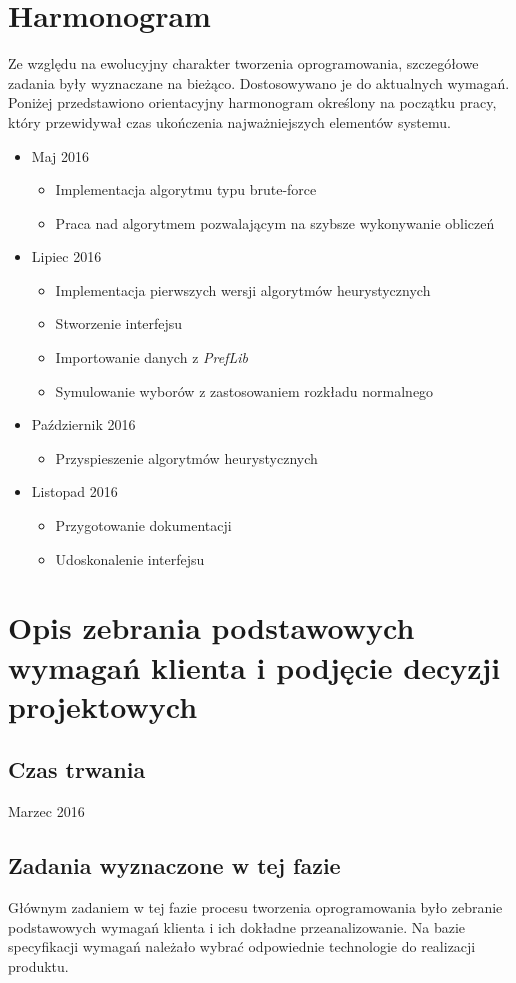 \documentclass[pdflatex,11pt]{../aghdoc_version2}
\begin{document}
\section{Harmonogram}
Ze względu na ewolucyjny charakter tworzenia oprogramowania, szczegółowe zadania były wyznaczane na bieżąco. Dostosowywano je do aktualnych wymagań. Poniżej przedstawiono orientacyjny harmonogram określony na początku pracy, który
przewidywał czas ukończenia najważniejszych elementów systemu.
\begin{itemize}
\item Maj 2016
	\begin{itemize}
	\item Implementacja algorytmu typu brute-force
	\item Praca nad algorytmem pozwalającym na szybsze wykonywanie obliczeń
	\end{itemize}
\item Lipiec 2016
	\begin{itemize}
	\item Implementacja pierwszych wersji algorytmów heurystycznych
	\item Stworzenie interfejsu
	\item Importowanie danych z \textit{PrefLib}
	\item Symulowanie wyborów z zastosowaniem rozkładu normalnego
	\end{itemize}
\item Październik 2016
	\begin{itemize}
	\item Przyspieszenie algorytmów heurystycznych
	\end{itemize}
\item Listopad 2016
	\begin{itemize}
	\item Przygotowanie dokumentacji
	\item Udoskonalenie interfejsu
	\end{itemize}
\end{itemize}

\section{Opis zebrania podstawowych wymagań klienta i podjęcie
decyzji projektowych}

\subsection{Czas trwania}
Marzec 2016
\subsection{Zadania wyznaczone w tej fazie}
Głównym zadaniem w tej fazie procesu tworzenia oprogramowania było zebranie
podstawowych wymagań klienta i ich dokładne przeanalizowanie. Na bazie specyfikacji
wymagań należało wybrać odpowiednie technologie do realizacji produktu.
\end{document}
